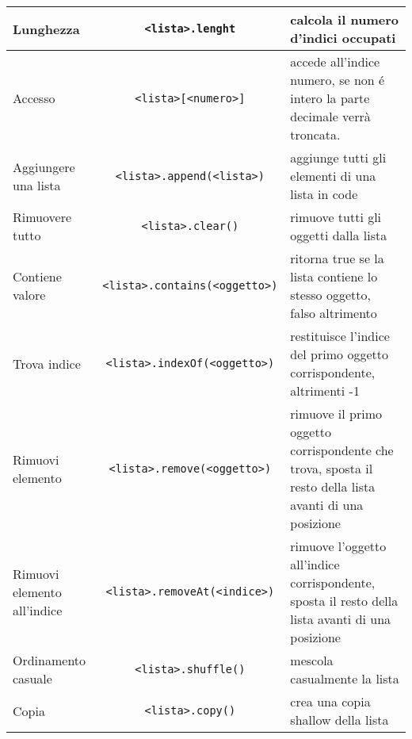 \begin{center}
\begin{tabularx}{\linewidth}{| X | c | X |}
    \hline 
    Lunghezza & \lstinline|<lista>.lenght| & calcola il numero d'indici occupati \\
    \hline
    Accesso & \lstinline|<lista>[<numero>]| & accede all'indice numero, se non é intero la parte decimale verrà
     troncata. \\
    \hline
    Aggiungere \newline una lista & \lstinline|<lista>.append(<lista>)| & aggiunge tutti gli elementi di una lista in code \\
    \hline
    Rimuovere tutto & \lstinline|<lista>.clear()|& rimuove tutti gli oggetti dalla lista\\
    \hline
    Contiene valore & \lstinline|<lista>.contains(<oggetto>)| & ritorna true se la lista contiene lo stesso 
    oggetto, falso altrimento \\ 
    \hline
    Trova indice & \lstinline|<lista>.indexOf(<oggetto>)|& restituisce l'indice del primo oggetto corrispondente,
    altrimenti -1 \\
    \hline
    Rimuovi elemento & \lstinline|<lista>.remove(<oggetto>)|& rimuove il primo oggetto corrispondente che trova,
    sposta il resto della lista avanti di una posizione \\
    \hline    
    Rimuovi elemento all'indice & \lstinline|<lista>.removeAt(<indice>)|& rimuove l'oggetto all'indice corrispondente,
    sposta il resto della lista avanti di una posizione \\
    \hline    
    Ordinamento \newline casuale & \lstinline|<lista>.shuffle()| & mescola casualmente la lista \\
    \hline
    Copia & \lstinline|<lista>.copy()| & crea una copia shallow della lista \\
    \hline
\end{tabularx}
\end{center}

\newpage
